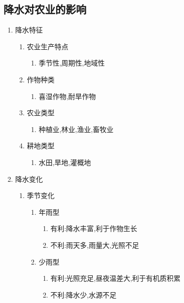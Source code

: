 \documentclass[a4paper]{article}
\begin{document}
    \subsection{降水对农业的影响}
    \begin{enumerate}
        \item 降水特征
        \begin{enumerate}
            \item 农业生产特点
            \begin{enumerate}
                \item 季节性,周期性,地域性
            \end{enumerate}
            \item 作物种类
            \begin{enumerate}
                \item 喜湿作物,耐旱作物
            \end{enumerate}
            \item 农业类型
            \begin{enumerate}
                \item 种植业,林业,渔业,畜牧业
            \end{enumerate}
            \item 耕地类型
            \begin{enumerate}
                \item 水田,旱地,灌概地
            \end{enumerate}
        \end{enumerate}
        \item 降水变化
        \begin{enumerate}
            \item 季节变化
            \begin{enumerate}
                \item 年雨型
                \begin{enumerate}
                    \item 有利:降水丰富,利于作物生长
                    \item 不利:雨天多,雨量大,光照不足
                \end{enumerate}
                \item 少雨型
                \begin{enumerate}
                    \item 有利:光照充足,昼夜温差大,利于有机质积累
                    \item 不利:降水少,水源不足

\end{enumerate}
\end{enumerate}
\end{enumerate}
\end{enumerate}
\end{document}
